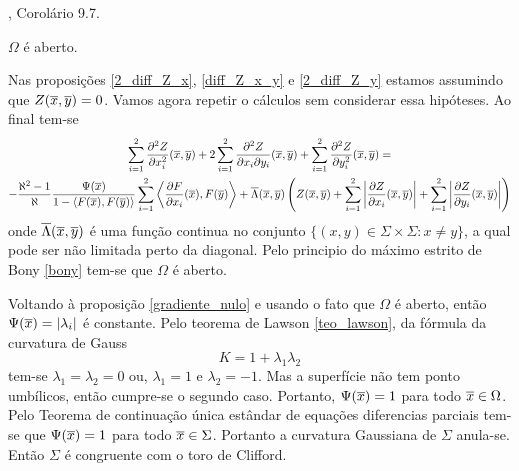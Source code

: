 \begin{demonstracao}
	\cite{Brendle2010}, Corolário 9.7.
\end{demonstracao}

\begin{proposicao}
	$\Omega$ é aberto.
\end{proposicao}

\begin{demonstracao}
	Nas proposições \eqref{2_diff_Z_x}, \eqref{diff_Z_x_y} e \eqref{2_diff_Z_y} estamos assumindo que $Z(\overline{x},\overline{y}) = 0$. Vamos agora repetir o cálculos sem considerar essa hipóteses. Ao final tem-se
	\begin{multline*}
	\sum_{i=1}^2 \frac{\partial^2 Z}{\partial x_i^2}(\overline{x},\overline{y}) + 2 \sum_{i=1}^2 \frac{\partial^2 Z}{\partial x_i \partial y_i}(\overline{x},\overline{y}) + \sum_{i=1}^2 \frac{\partial^2 Z}{\partial y_i^2}(\overline{x},\overline{y}) =\\
	- \frac{\aleph^2 - 1}{\aleph} \frac{\Psi(\overline{x})}{1 - \langle F(\overline{x}), F(\overline{y}) \rangle} \sum_{i=1}^2 \left\langle \frac{\partial F}{\partial x_i}(\overline{x}), F(\overline{y}) \right\rangle + \overline{\Lambda}(\overline{x},\overline{y}) \left( Z(\overline{x},\overline{y}) + \sum_{i=1}^2 \left| \frac{\partial Z}{\partial x_i}(\overline{x},\overline{y}) \right| + \sum_{i=1}^2 \left| \frac{\partial Z}{\partial y_i}(\overline{x},\overline{y}) \right| \right)
	\end{multline*}
	onde $\overline{\Lambda}(\overline{x},\overline{y})$ é uma função continua no conjunto $\{ (x,y) \in \Sigma \times \Sigma: x \neq y \}$, a qual pode ser não limitada perto da diagonal.	
	Pelo principio do máximo estrito de Bony \ref{bony} tem-se que $\Omega$ é aberto.
\end{demonstracao}

Voltando à proposição \ref{gradiente_nulo} e usando o fato que $\Omega$ é aberto, então $\Psi(\overline{x})= |\lambda_i|$ é constante. Pelo teorema de Lawson \ref{teo_lawson}, da fórmula da curvatura de Gauss
\begin{equation*}
	K = 1 + \lambda_1 \lambda_2
\end{equation*}
tem-se $\lambda_1 = \lambda_2 = 0$ ou, $\lambda_1 = 1$ e $\lambda_2=-1$. Mas a superfície não tem ponto umbílicos, então cumpre-se o segundo caso. Portanto, $\Psi(\overline{x})=1$ para todo $\overline{x} \in \Omega$.	
Pelo Teorema de continuação única estândar de equações diferencias parciais \cite{Aronszajn1957} tem-se que $\Psi(\overline{x}) = 1$ para todo $\overline{x} \in \Sigma$. Portanto a curvatura Gaussiana de $\Sigma$ anula-se. Então $\Sigma$ é congruente com o toro de Clifford.